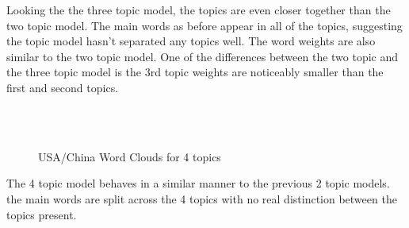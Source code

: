 Looking the the three topic model, the topics are even closer together than the two topic model. The main words as before appear in all of the topics, suggesting the topic model hasn't separated any topics well. The word weights are also similar to the two topic model. One of the differences between the two topic and the three topic model is the 3rd topic weights are noticeably smaller than the first and second topics. 

\begin{figure}[H]
	\centering
	\\
	\\
	
	\caption{USA/China Word Clouds for 4 topics}
	\label{fig:usa4}
\end{figure}

The 4 topic model behaves in a similar manner to the previous 2 topic models. the main words are split across the 4 topics with no real distinction between the topics present. 
